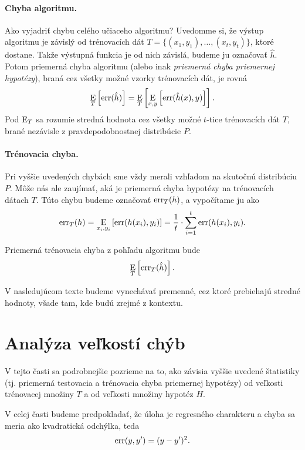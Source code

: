 \paragraph{Chyba algoritmu.}
Ako vyjadriť chybu celého učiaceho algoritmu? Uvedomme si, že výstup
algoritmu je závislý od trénovacích dát $T = \{(x_1, y_1), \ldots, (x_t, y_t)\}$,
ktoré dostane. Takže výstupná funkcia je od nich závislá, budeme ju
označovať $\hat{h}$. Potom priemerná chyba algoritmu (alebo inak
\emph{priemerná chyba priemernej hypotézy}), braná cez všetky možné
vzorky trénovacích dát, je rovná
$$\operatorname*{\mathrm{E}}_T \left[ \mathrm{err}(\hat{h}) \right] = \operatorname*{\mathrm{E}}_T \left[ \operatorname*{\mathrm{E}}_{x,y} \left[ \mathrm{err}(\hat{h}(x), y) \right] \right].$$
Pod $\operatorname*{\mathrm{E}}_T$ sa rozumie stredná hodnota cez všetky možné $t$-tice
trénovacích dát $T$, brané nezávisle z pravdepodobnostnej
distribúcie $P$.

\paragraph{Trénovacia chyba.}
Pri vyššie uvedených chybách sme vždy merali vzhľadom na skutočnú
distribúciu $P$. Môže nás ale zaujímať, aká je priemerná chyba
hypotézy na trénovacích dátach $T$. Túto chybu budeme označovať
$\mathrm{err}_T(h)$, a vypočítame ju ako
$$\mathrm{err}_T(h) = \operatorname*{\mathrm{E}}_{x_i, y_i} \left[ \mathrm{err}(h(x_i), y_i) \right] = \frac{1}{t} \cdot \sum_{i=1}^t \mathrm{err}(h(x_i), y_i).$$

Priemerná trénovacia chyba z pohľadu algoritmu bude
$$\operatorname*{\mathrm{E}}_T \left[ \mathrm{err}_T(\hat{h}) \right].$$

V nasledujúcom texte budeme vynechávať premenné, cez ktoré prebiehajú
stredné hodnoty, všade tam, kde budú zrejmé z kontextu.




\section{Analýza veľkostí chýb}

V tejto časti sa podrobnejšie pozrieme na to, ako závisia vyššie
uvedené štatistiky (tj. priemerná testovacia a trénovacia chyba
priemernej hypotézy) od veľkosti trénovacej množiny $T$ a od veľkosti
množiny hypotéz $H$.

V celej časti budeme predpokladať, že úloha je regresného
charakteru a chyba sa meria ako kvadratická odchýlka, teda
$$\mathrm{err}(y, y') = (y - y')^2.$$



